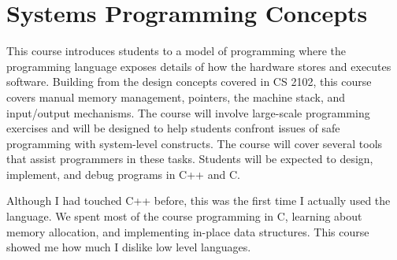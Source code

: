 \section{Systems Programming Concepts}

\begin{meta}
\end{meta}


\coursedesc
This course introduces students to a model of programming where the
programming language exposes details of how the hardware stores and
executes software. Building from the design concepts covered in CS 2102,
this course covers manual memory management, pointers, the machine
stack, and input/output mechanisms. The course will involve large-scale
programming exercises and will be designed to help students confront
issues of safe programming with system-level constructs. The course will
cover several tools that assist programmers in these tasks. Students
will be expected to design, implement, and debug programs in C++ and C.

\courseself
Although I had touched C++ before, this was the first time I actually
used the language. We spent most of the course programming in C,
learning about memory allocation, and implementing in-place data
structures. This course showed me how much I dislike low level
languages.


